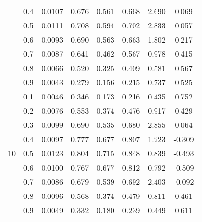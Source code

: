 \documentclass[11pt,a4paper]{report}
\begin{document}
\begin{longtable}{ | c | c || c | c | c | c | c | c | }
 & 0.4 & 0.0107 & 0.676 & 0.561 & 0.668 & 2.690 & 0.069 \\
 & 0.5 & 0.0111 & 0.708 & 0.594 & 0.702 & 2.833 & 0.057 \\
 & 0.6 & 0.0093 & 0.690 & 0.563 & 0.663 & 1.802 & 0.217 \\
 & 0.7 & 0.0087 & 0.641 & 0.462 & 0.567 & 0.978 & 0.415 \\
 & 0.8 & 0.0066 & 0.520 & 0.325 & 0.409 & 0.581 & 0.567 \\
 & 0.9 & 0.0043 & 0.279 & 0.156 & 0.215 & 0.737 & 0.525 \\
 \hline
\multirow{9}{*}{10} & 0.1 & 0.0046 & 0.346 & 0.173 & 0.216 & 0.435 & 0.752 \\
 & 0.2 & 0.0076 & 0.553 & 0.374 & 0.476 & 0.917 & 0.429 \\
 & 0.3 & 0.0099 & 0.690 & 0.535 & 0.680 & 2.855 & 0.064 \\
 & 0.4 & 0.0097 & 0.777 & 0.677 & 0.807 & 1.223 & -0.309 \\
 & 0.5 & 0.0123 & 0.804 & 0.715 & 0.848 & 0.839 & -0.493 \\
 & 0.6 & 0.0100 & 0.767 & 0.677 & 0.812 & 0.792 & -0.509 \\
 & 0.7 & 0.0086 & 0.679 & 0.539 & 0.692 & 2.403 & -0.092 \\
 & 0.8 & 0.0096 & 0.568 & 0.374 & 0.479 & 0.811 & 0.461 \\
 & 0.9 & 0.0049 & 0.332 & 0.180 & 0.239 & 0.449 & 0.611 \\
 \hline
\hline
\end{longtable}
\end{document}
